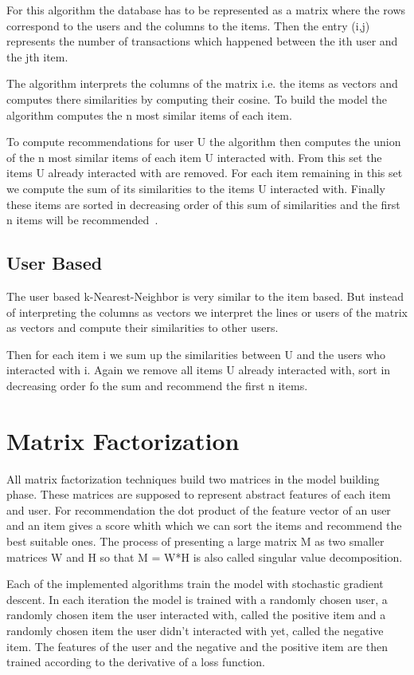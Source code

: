 For this algorithm the database has to be represented as a matrix
where the rows correspond to the users and the columns to the items.
Then the entry (i,j) represents the number of transactions which happened
between the ith user and the jth item. 

The algorithm interprets the columns of the matrix i.e. the items
as vectors and computes there similarities by computing their cosine.
To build the model the algorithm computes the n most similar items
of each item. 

To compute recommendations for user U the algorithm then computes
the union of the n most similar items of each item U interacted with.
From this set the items U already interacted with are removed. For
each item remaining in this set we compute the sum of its similarities
to the items U interacted with. Finally these items are sorted in
decreasing order of this sum of similarities and the first n items
will be recommended~\cite{Karypis:2001:EIT:502585.502627}.


\subsection{User Based}

The user based k-Nearest-Neighbor is very similar to the item based.
But instead of interpreting the columns as vectors we interpret the
lines or users of the matrix as vectors and compute their similarities
to other users.

Then for each item i we sum up the similarities between U and the
users who interacted with i. Again we remove all items U already interacted
with, sort in decreasing order fo the sum and recommend the first
n items.


\section{Matrix Factorization}

All matrix factorization techniques build two matrices in the model
building phase. These matrices are supposed to represent abstract
features of each item and user. For recommendation the dot product
of the feature vector of an user and an item gives a score whith which
we can sort the items and recommend the best suitable ones. The process
of presenting a large matrix M as two smaller matrices W and H so
that M = W{*}H is also called singular value decomposition.

Each of the implemented algorithms train the model with stochastic
gradient descent. In each iteration the model is trained with a randomly
chosen user, a randomly chosen item the user interacted with, called
the positive item and a randomly chosen item the user didn't interacted
with yet, called the negative item. The features of the user and the
negative and the positive item are then trained according to the derivative
of a loss function.



